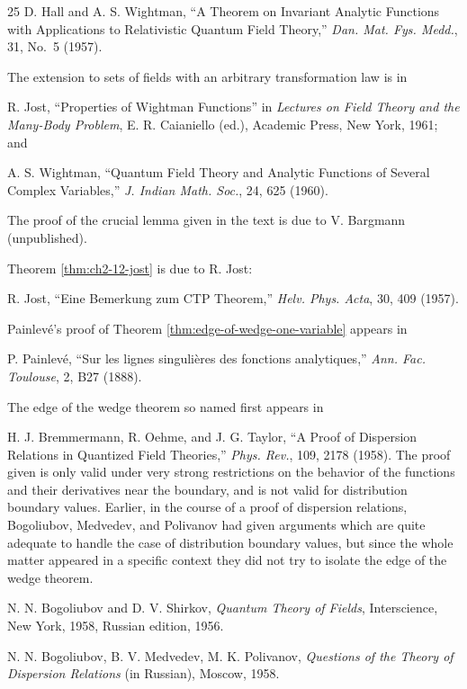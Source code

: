 \begin{thebibliography}{25}
D. Hall and A. S. Wightman, ``A Theorem on Invariant Analytic Functions with
Applications to Relativistic Quantum Field Theory,'' \emph{Dan. Mat. Fys.
Medd.}, 31, No.~5 (1957).

The extension to sets of fields with an arbitrary transformation law is in

R. Jost, ``Properties of Wightman Functions'' in \emph{Lectures on Field
Theory and the Many-Body Problem}, E. R. Caianiello (ed.), Academic Press,
New York, 1961; and

A. S. Wightman, ``Quantum Field Theory and Analytic Functions of Several
Complex Variables,'' \emph{J. Indian Math. Soc.}, 24, 625 (1960).

The proof of the crucial lemma given in the text is due to V. Bargmann
(unpublished).

Theorem \ref{thm:ch2-12-jost} is due to R. Jost:

R. Jost, ``Eine Bemerkung zum CTP Theorem,'' \emph{Helv. Phys. Acta}, 30,
409 (1957).

Painlev\'e's proof of Theorem \ref{thm:edge-of-wedge-one-variable} appears in

P. Painlev\'e, ``Sur les lignes singuli\`eres des fonctions analytiques,''
\emph{Ann. Fac. Toulouse}, 2, B27 (1888).

The edge of the wedge theorem so named first appears in

H. J. Bremmermann, R. Oehme, and J. G. Taylor, ``A Proof of Dispersion
Relations in Quantized Field Theories,'' \emph{Phys. Rev.}, 109, 2178 (1958).
The proof given is only valid under very strong restrictions on the behavior
of the functions and their derivatives near the boundary, and is not valid
for distribution boundary values.  Earlier, in the course of a proof of
dispersion relations, Bogoliubov, Medvedev, and Polivanov had given arguments
which are quite adequate to handle the case of distribution boundary values,
but since the whole matter appeared in a specific context they did not try to
isolate the edge of the wedge theorem.

N. N. Bogoliubov and D. V. Shirkov, \emph{Quantum Theory of Fields},
Interscience, New York, 1958, Russian edition, 1956.

N. N. Bogoliubov, B. V. Medvedev, M. K. Polivanov, \emph{Questions of the
Theory of Dispersion Relations} (in Russian), Moscow, 1958.


\end{thebibliography}
